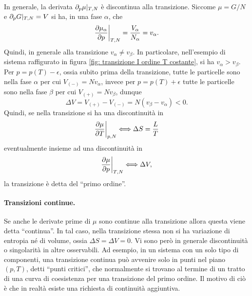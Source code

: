 In generale, la derivata $\partial_p\mu|_{T,N}$ è discontinua alla transizione. Siccome $\mu = G/N$ e $\partial_pG|_{T,N} = V$ si ha, in una fase $\alpha$, che
\begin{equation}
    \frac{\partial\mu_\alpha}{\partial p}\bigg|_{T,N} = \frac{V_\alpha}{N_\alpha} = v_\alpha.
\end{equation}
Quindi, in generale alla transizione $v_\alpha \neq v_\beta$. In particolare, nell'esempio di sistema raffigurato in figura \ref{fig: transizione I ordine T costante}, si ha $v_\alpha > v_\beta$. Per $p = p(T) - \epsilon$, ossia subito prima della transizione, tutte le particelle sono nella fase $\alpha$ per cui $V_{(-)} = Nv_\alpha$, invece per $p = p(T) + \epsilon$ tutte le particelle sono nella fase $\beta$ per cui $V_{(+)} = Nv_\beta$, dunque
\begin{equation}
    \Delta V = V_{(+)} - V_{(-)} = N(v_\beta - v_\alpha) < 0.
\end{equation}
Quindi, se nella transizione si ha una discontinuità in
\begin{equation}
    \frac{\partial\mu}{\partial T}\bigg|_{p,N}\Longleftrightarrow\Delta S = \frac{L}{T}
\end{equation}
eventualmente insieme ad una discontinuità in
\begin{equation}
    \frac{\partial\mu}{\partial p}\bigg|_{T,N}\Longleftrightarrow\Delta V,
\end{equation}
la transizione è detta del ``primo ordine''.
\paragraph{Transizioni continue.} Se anche le derivate prime di $\mu$ sono continue alla transizione allora questa viene detta ``continua''. In tal caso, nella transizione stessa non si ha variazione di entropia né di volume, ossia $\Delta S = \Delta V = 0$. Vi sono però in generale discontinuità o singolarità in altre osservabili. Ad esempio, in un sistema con un solo tipo di componenti, una transizione continua può avvenire solo in punti nel piano $(p,T)$, detti ``punti critici'', che normalmente si trovano al termine di un tratto di una curva di coesistenza per una transizione del primo ordine. Il motivo di ciò è che in realtà esiste una richiesta di continuità aggiuntiva.

